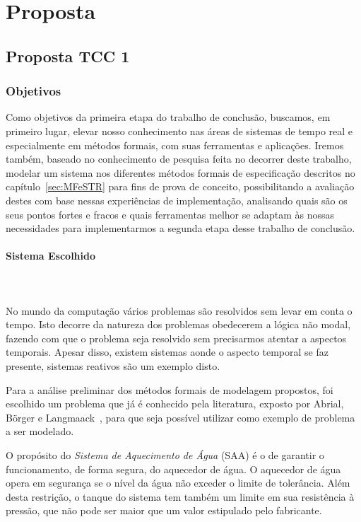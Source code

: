 \section{Proposta}
\subsection{Proposta TCC 1}
\subsubsection{Objetivos}
Como objetivos da primeira etapa do trabalho de conclusão, buscamos, em primeiro lugar,
elevar nosso conhecimento nas áreas de sistemas de tempo real e especialmente
em métodos formais, com suas ferramentas e aplicações. Iremos também,
baseado no conhecimento de pesquisa feita no decorrer deste trabalho, modelar um sistema
nos diferentes métodos formais de especificação descritos no capítulo~\ref{sec:MFeSTR} para fins de
prova de conceito, possibilitando a avaliação destes com base nessas experiências de implementação,
analisando quais são os seus pontos fortes e fracos e quais ferramentas melhor se adaptam às nossas
necessidades para implementarmos a segunda etapa desse trabalho de conclusão.
\\

\paragraph{Sistema Escolhido}\mbox{} \\\\
No mundo da computação vários problemas são resolvidos sem levar em conta o tempo.
Isto decorre da natureza dos problemas obedecerem a lógica não modal, fazendo com que o
problema seja resolvido sem precisarmos atentar a aspectos temporais. Apesar disso,
existem sistemas aonde o aspecto temporal se faz presente, sistemas reativos são um exemplo disto.

Para a análise preliminar dos métodos formais de modelagem propostos, foi escolhido um problema que
já é conhecido pela literatura, exposto por Abrial, B\"{o}rger e Langmaack~\cite{opac-b1092561},
para que seja possível utilizar como exemplo de problema a ser modelado.

O propósito do \textit{Sistema de Aquecimento de Água} (SAA) é o de garantir o funcionamento,
de forma segura, do aquecedor de água. O aquecedor de água opera em segurança se o nível da água
não exceder o limite de tolerância. Além desta restrição, o tanque do sistema tem também
um limite em sua resistência à pressão, que não pode ser maior que um valor estipulado pelo fabricante.

